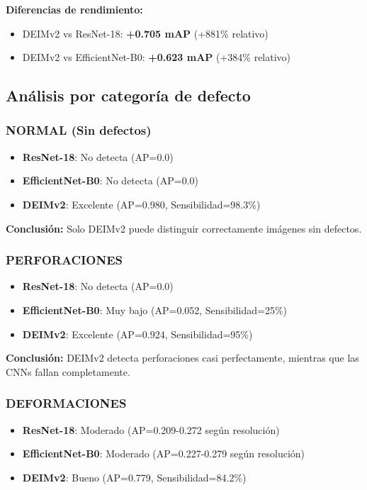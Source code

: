 \textbf{Diferencias de rendimiento:}
\begin{itemize}
    \item DEIMv2 vs ResNet-18: \textbf{+0.705 mAP} (+881\% relativo)
    \item DEIMv2 vs EfficientNet-B0: \textbf{+0.623 mAP} (+384\% relativo)
\end{itemize}

\subsection{Análisis por categoría de defecto}

\subsubsection{NORMAL (Sin defectos)}
\begin{itemize}
    \item \textbf{ResNet-18}: No detecta (AP=0.0)
    \item \textbf{EfficientNet-B0}: No detecta (AP=0.0)
    \item \textbf{DEIMv2}: Excelente (AP=0.980, Sensibilidad=98.3\%)
\end{itemize}

\textbf{Conclusión:} Solo DEIMv2 puede distinguir correctamente imágenes sin defectos.

\subsubsection{PERFORACIONES}
\begin{itemize}
    \item \textbf{ResNet-18}: No detecta (AP=0.0)
    \item \textbf{EfficientNet-B0}: Muy bajo (AP=0.052, Sensibilidad=25\%)
    \item \textbf{DEIMv2}: Excelente (AP=0.924, Sensibilidad=95\%)
\end{itemize}

\textbf{Conclusión:} DEIMv2 detecta perforaciones casi perfectamente, mientras que las CNNs fallan completamente.

\subsubsection{DEFORMACIONES}
\begin{itemize}
    \item \textbf{ResNet-18}: Moderado (AP=0.209-0.272 según resolución)
    \item \textbf{EfficientNet-B0}: Moderado (AP=0.227-0.279 según resolución)
    \item \textbf{DEIMv2}: Bueno (AP=0.779, Sensibilidad=84.2\%)
\end{itemize}

